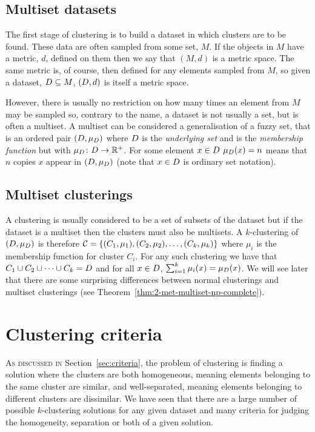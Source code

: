 \subsection{Multiset datasets}
\label{sec:datasets}

The first stage of clustering is to build a dataset in which clusters are to
be found.  These data are often sampled from some set, $M$.  If the objects in
$M$ have a metric, $d$, defined on them then we say that $(M,d)$ is a metric
space.  The same metric is, of course, then defined for any elements sampled
from $M$, so given a dataset, $D \subseteq M$, $(D,d)$ is itself a
metric space.

However, there is usually no restriction on how many times an element from $M$
may be sampled so, contrary to the name, a dataset is not usually a set, but
is often a multiset.  A multiset can be considered a generalisation of a fuzzy
set, that is an ordered pair $(D,\mu_{D})$ where $D$ is the
\textit{underlying set} and is the \textit{membership function} but with
$\mu_{D} \colon D \to \mathbb{R}^+$.  For some element $x \in D$
$\mu_{D}(x) = n$ means that $n$ copies $x$ appear in $(D,\mu_{D})$
(note that $x \in D$ is ordinary set notation).

\subsection{Multiset clusterings}
\label{sec:multiset-clusterings}

A clustering is usually considered to be a set of subsets of the dataset but
if the dataset is a multiset then the clusters must also be multisets.  A
$k$-clustering of $(D,\mu_{D})$ is therefore $\mathcal{C} =
\{(C_{1},\mu_{1}),(C_{2},\mu_{2}),\dotsc,(C_{k},\mu_{k})\}$ where $\mu_i$ is
the membership function for cluster $C_i$.  For any such clustering we have
that $C_{1} \cup C_{2} \cup \dotsb \cup C_{k} = D$ and for all $x \in
D$, $\sum_{i=1}^{k} \mu_{i}(x) = \mu_{D}(x)$.  We will see later that
there are some surprising differences between normal clusterings and multiset
clusterings (see Theorem~\ref{thm:2-met-multiset-np-complete}).

\section{Clustering criteria}
\label{sec:clustering-criteria}

\textsc{As discussed in} Section~\ref{sec:criteria}, the problem of clustering
is finding a solution where the clusters are both homogeneous, meaning
elements belonging to the same cluster are similar, and well-separated,
meaning elements belonging to different clusters are dissimilar.  We have seen
that there are a large number of possible $k$-clustering solutions for any
given dataset and many criteria for judging the homogeneity, separation or
both of a given solution.

